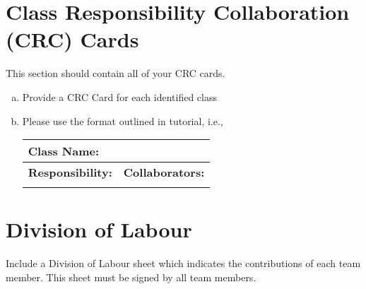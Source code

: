 \documentclass[]{article}
\begin{document}
	
\section{Class Responsibility Collaboration (CRC) Cards}
\label{sec:class_responsibility_collaboration_crc_cards}
This section should contain all of your CRC cards.

\begin{enumerate}[a)]
	\item Provide a CRC Card for each identified class
	\item Please use the format outlined in tutorial, i.e., 
	\begin{table}[ht]
		\centering
		\begin{tabular}{|p{5cm}|p{5cm}|}
		\hline 
		 \multicolumn{2}{|l|}{\textbf{Class Name:}} \\
		\hline
		\textbf{Responsibility:} & \textbf{Collaborators:} \\
		\hline
		\vspace{1in} & \\
		\hline
		\end{tabular}
	\end{table}
	
\end{enumerate}

\appendix
\section{Division of Labour}
\label{sec:division_of_labour}
Include a Division of Labour sheet which indicates the contributions of each team member. This sheet must be signed by all team members.

\newpage
\end{document}
